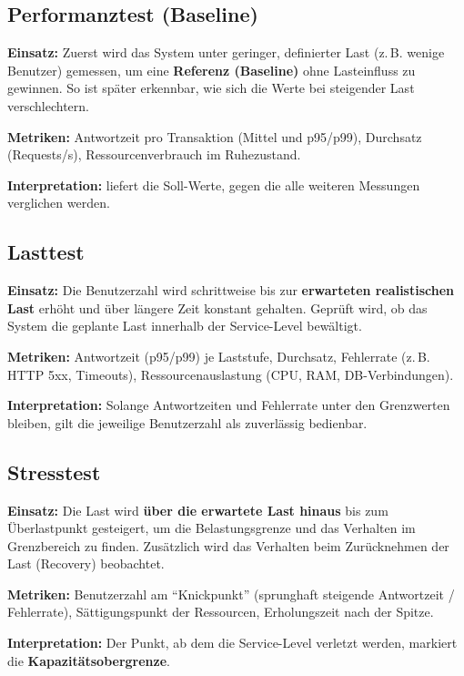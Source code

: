 \documentclass[
	fontsize=12pt,          %
	paper=a4,               %
	numbers=noenddot,       %
	listof=totoc,           %
	listof=entryprefix,     %
	listof=nochaptergap,    %
	bibliography=totoc,     %
	parskip=half,           %
	openany                 %
]{scrbook}
\begin{document}
\subsection*{Performanztest (Baseline)}

\textbf{Einsatz:} Zuerst wird das System unter geringer, definierter Last
(z.\,B. wenige Benutzer) gemessen, um eine \textbf{Referenz (Baseline)} ohne
Last\-einfluss zu gewinnen.
So ist später erkennbar, wie sich die Werte bei steigender Last verschlechtern.

\textbf{Metriken:} Antwortzeit pro Transaktion (Mittel und p95/p99), Durchsatz
(Requests/s), Ressourcenverbrauch im Ruhezustand.

\textbf{Interpretation:} liefert die Soll-Werte, gegen die alle weiteren
Messungen verglichen werden.

\subsection*{Lasttest}

\textbf{Einsatz:} Die Benutzerzahl wird schrittweise bis zur \textbf{erwarteten
realistischen Last} erhöht und über längere Zeit konstant gehalten.
Geprüft wird, ob das System die geplante Last innerhalb der Service-Level
bewältigt.

\textbf{Metriken:} Antwortzeit (p95/p99) je Laststufe, Durchsatz, Fehlerrate
(z.\,B. HTTP 5xx, Timeouts), Ressourcenauslastung (CPU, RAM, DB-Verbindungen).

\textbf{Interpretation:} Solange Antwortzeiten und Fehlerrate unter den
Grenzwerten bleiben, gilt die jeweilige Benutzerzahl als zuverlässig bedienbar.

\subsection*{Stresstest}

\textbf{Einsatz:} Die Last wird \textbf{über die erwartete Last hinaus} bis zum
Überlastpunkt gesteigert, um die Belastungsgrenze und das Verhalten im
Grenzbereich zu finden.
Zusätzlich wird das Verhalten beim Zurücknehmen der Last (Recovery) beobachtet.

\textbf{Metriken:} Benutzerzahl am ``Knickpunkt'' (sprunghaft steigende
Antwortzeit / Fehlerrate), Sättigungspunkt der Ressourcen, Erholungszeit nach
der Spitze.

\textbf{Interpretation:} Der Punkt, ab dem die Service-Level verletzt werden,
markiert die \textbf{Kapazitätsobergrenze}.
\end{document}
